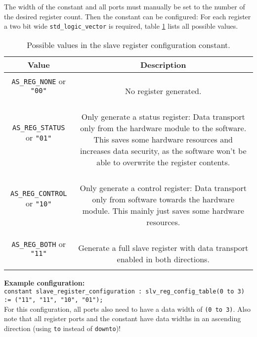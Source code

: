 The width of the constant and all ports must manually be set to the number of the desired register count.
Then the constant can be configured:
For each register a two bit wide \texttt{std\_logic\_vector} is required, table \ref{table:05-01-slave_register_config_values} lists all possible values.

\begin{longtable}[ht]{|c|c|}
    \hline
    \textbf{Value} & \textbf{Description}\\
    \hline
    
    \texttt{AS\_REG\_NONE} or \texttt{"00"} & \parbox{11cm}{\ \\
        No register generated.\\
    }\\
    \hline
    
    \texttt{AS\_REG\_STATUS} or \texttt{"01"} & \parbox{11cm}{\ \\
        Only generate a status register: Data transport only from the hardware module to the software. This saves some hardware resources and increases data security, as the software won't be able to overwrite the register contents.\\
    }\\
    \hline
    
    \texttt{AS\_REG\_CONTROL} or \texttt{"10"} & \parbox{11cm}{\ \\
        Only generate a control register: Data transport only from software towards the hardware module. This mainly just saves some hardware resources.\\
    }\\
    \hline
    
    \texttt{AS\_REG\_BOTH} or \texttt{"11"} & \parbox{11cm}{\ \\
        Generate a full slave register with data transport enabled in both directions.\\
    }\\
    \hline
    
    \caption{Possible values in the slave register configuration constant.}
    \label{table:05-01-slave_register_config_values}
\end{longtable}


\textbf{Example configuration:}\\
\texttt{constant slave\_register\_configuration : slv\_reg\_config\_table(0 to 3) := ("11", "11", "10", "01");}\\
For this configuration, all ports also need to have a data width of \texttt{(0 to 3)}. Also note that all register ports and the constant have data widths in an ascending direction (using \texttt{to} instead of \texttt{downto})!

